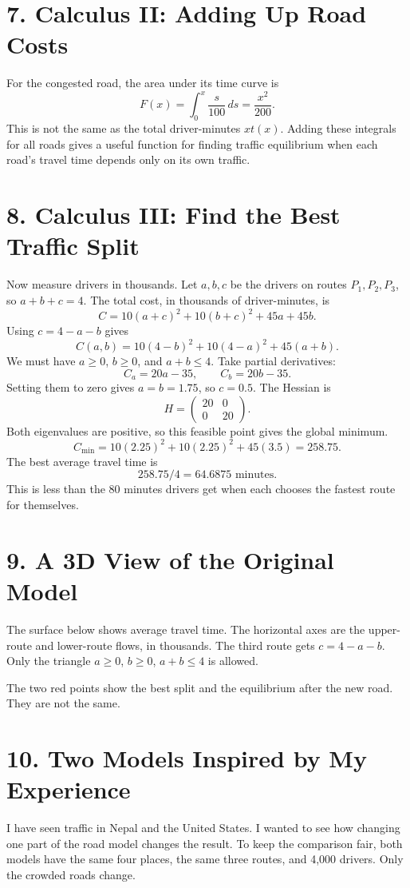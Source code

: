 \documentclass[11pt,a4paper]{article}
\newcommand{\sectiontitle}[1]{\section*{\color{navy}#1}}
\begin{document}
\sectiontitle{7. Calculus II: Adding Up Road Costs}
For the congested road, the area under its time curve is
\[F(x)=\int_0^x\frac{s}{100}\,ds=\frac{x^2}{200}.\]
This is not the same as the total driver-minutes $xt(x)$. Adding these integrals for all roads gives a useful function for finding traffic equilibrium when each road's travel time depends only on its own traffic.

\sectiontitle{8. Calculus III: Find the Best Traffic Split}
Now measure drivers in thousands. Let $a,b,c$ be the drivers on routes $P_1,P_2,P_3$, so $a+b+c=4$. The total cost, in thousands of driver-minutes, is
\[C=10(a+c)^2+10(b+c)^2+45a+45b.\]
Using $c=4-a-b$ gives
\[C(a,b)=10(4-b)^2+10(4-a)^2+45(a+b).\]
We must have $a\geq0$, $b\geq0$, and $a+b\leq4$. Take partial derivatives:
\[C_a=20a-35,\qquad C_b=20b-35.\]
Setting them to zero gives $a=b=1.75$, so $c=0.5$. The Hessian is
\[H=\begin{pmatrix}20&0\\0&20\end{pmatrix}.\]
Both eigenvalues are positive, so this feasible point gives the global minimum.
\[C_{\min}=10(2.25)^2+10(2.25)^2+45(3.5)=258.75.\]
The best average travel time is
\[\boxed{258.75/4=64.6875\text{ minutes}.}\]
This is less than the 80 minutes drivers get when each chooses the fastest route for themselves.

\sectiontitle{9. A 3D View of the Original Model}
The surface below shows average travel time. The horizontal axes are the upper-route and lower-route flows, in thousands. The third route gets $c=4-a-b$. Only the triangle $a\geq0$, $b\geq0$, $a+b\leq4$ is allowed.
\begin{center}\end{center}
The two red points show the best split and the equilibrium after the new road. They are not the same.

\sectiontitle{10. Two Models Inspired by My Experience}
I have seen traffic in Nepal and the United States. I wanted to see how changing one part of the road model changes the result. To keep the comparison fair, both models have the same four places, the same three routes, and 4,000 drivers. Only the crowded roads change.
\end{document}
